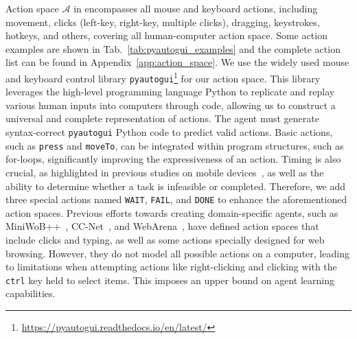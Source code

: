 Action space 
$\mathcal{A}$ in \ours encompasses all mouse and keyboard actions, including movement, clicks (left-key, right-key, multiple clicks), dragging, keystrokes, hotkeys, and others, covering all human-computer action space.
Some action examples are shown in Tab.~\ref{tab:pyautogui_examples} and the complete action list can be found in Appendix~\ref{app:action_space}. 
We use the widely used mouse and keyboard control library \texttt{pyautogui}\footnote{\url{https://pyautogui.readthedocs.io/en/latest/}} for our action space. 
This library leverages the high-level programming language Python to replicate and replay various human inputs into computers through code, allowing us to construct a universal and complete representation of actions. 
The agent must generate syntax-correct \texttt{pyautogui} Python code to predict valid actions. 
Basic actions, such as \texttt{press} and \texttt{moveTo}, can be integrated within program structures, such as for-loops, significantly improving the expressiveness of an action.
Timing is also crucial, as highlighted in previous studies on mobile devices~\citep{toyama2021androidenv}, as well as the ability to determine whether a task is infeasible or completed. 
Therefore, we add three special actions named \texttt{WAIT}, \texttt{FAIL}, and \texttt{DONE} to enhance the aforementioned action spaces.
Previous efforts towards creating domain-specific agents, such as MiniWoB++~\citep{shi2017world, liu2018reinforcement}, CC-Net~\citep{humphreys2022data}, and WebArena~\citep{zhou2023webarena, Koh2024VisualWebArenaEM}, have defined action spaces that include clicks and typing, as well as some actions specially designed for web browsing.
However, they do not model all possible actions on a computer, leading to limitations when attempting actions like right-clicking and clicking with the \texttt{ctrl} key held to select items.
This imposes an upper bound on agent learning capabilities.
